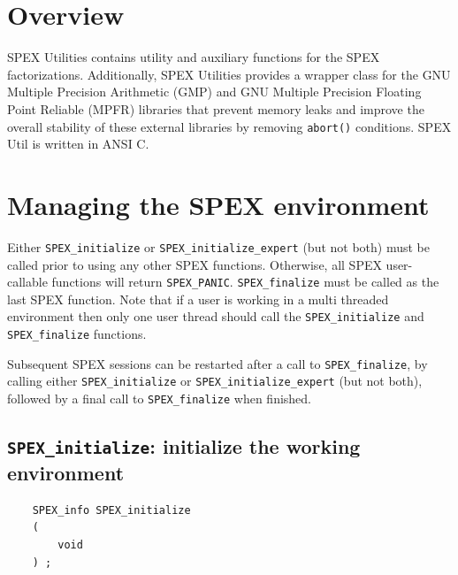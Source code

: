 \documentclass[12pt,oneside]{book}
\theoremstyle{definition}
\begin{document}
\section{Overview} \label{s:util:overview}
SPEX Utilities contains utility and auxiliary functions for the SPEX 
factorizations. Additionally, SPEX Utilities provides a wrapper class for
the GNU Multiple Precision Arithmetic (GMP) \cite{granlund2015gnu} and GNU
Multiple Precision Floating Point Reliable (MPFR) \cite{fousse2007mpfr}
libraries that prevent memory leaks and improve the overall stability of
these external libraries by removing \verb|abort()| conditions. SPEX Util is written in ANSI C.


\section{Managing the SPEX environment} \label{s:user:setup}
Either \verb|SPEX_initialize| or \verb|SPEX_initialize_expert| (but not both)
must be called prior to using any other SPEX functions. Otherwise, all SPEX user-callable functions will return \verb|SPEX_PANIC|. \verb|SPEX_finalize|
must be called as the last SPEX function. 
Note that if a user is working in a multi threaded environment then only one user thread should call the \verb|SPEX_initialize| and \verb|SPEX_finalize| functions.

Subsequent SPEX sessions can be restarted after a call to
\verb|SPEX_finalize|, by calling either \verb|SPEX_initialize| or
\verb|SPEX_initialize_expert| (but not both), followed by a final call to
\verb|SPEX_finalize| when finished.


\subsection{\texttt{SPEX\_initialize}: initialize the working environment}
\begin{mdframed}[userdefinedwidth=\textwidth]
{\footnotesize
\begin{verbatim}
    SPEX_info SPEX_initialize
    (
        void
    ) ;
\end{verbatim}
} \end{mdframed}
\end{document}
